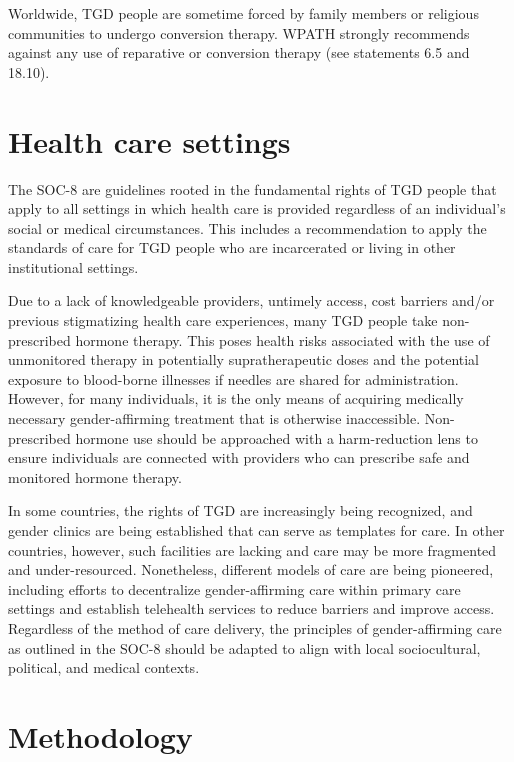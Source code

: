 \documentclass[
]{book}
\begin{document}
Worldwide, TGD people are sometime forced
by family members or religious communities to
undergo conversion therapy. WPATH strongly
recommends against any use of reparative or conversion therapy (see statements 6.5 and 18.10).

\hypertarget{health-care-settings}{%
\section*{Health care settings}\label{health-care-settings}}

The SOC-8 are guidelines rooted in the fundamental rights of TGD people that apply to all
settings in which health care is provided regardless
of an individual's social or medical circumstances.
This includes a recommendation to apply the standards of care for TGD people who are incarcerated or living in other institutional settings.

Due to a lack of knowledgeable providers,
untimely access, cost barriers and/or previous stigmatizing health care experiences, many TGD people take non-prescribed hormone therapy. This
poses health risks associated with the use of
unmonitored therapy in potentially supratherapeutic doses and the potential exposure to blood-borne
illnesses if needles are shared for administration.
However, for many individuals, it is the only
means of acquiring medically necessary
gender-affirming treatment that is otherwise inaccessible. Non-prescribed hormone use should be
approached with a harm-reduction lens to ensure
individuals are connected with providers who can
prescribe safe and monitored hormone therapy.

In some countries, the rights of TGD are
increasingly being recognized, and gender clinics
are being established that can serve as templates
for care. In other countries, however, such facilities are lacking and care may be more fragmented and under-resourced. Nonetheless,
different models of care are being pioneered,
including efforts to decentralize gender-affirming
care within primary care settings and establish
telehealth services to reduce barriers and improve
access. Regardless of the method of care delivery,
the principles of gender-affirming care as outlined
in the SOC-8 should be adapted to align with
local sociocultural, political, and medical contexts.

\hypertarget{methodology}{%
\section*{Methodology}\label{methodology}}
\end{document}
